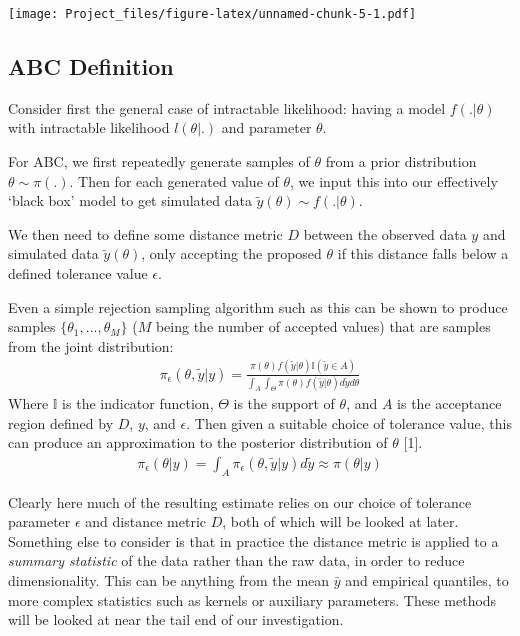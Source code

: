 \documentclass[
]{article}
\begin{document}
\texttt{[image: Project\_files/figure-latex/unnamed-chunk-5-1.pdf]}

\subsection{ABC Definition}\label{abc-definition}

Consider first the general case of intractable likelihood: having a
model \(f(.|\theta)\) with intractable likelihood \(l(\theta|.)\) and
parameter \(\theta\).

For ABC, we first repeatedly generate samples of \(\theta\) from a prior
distribution \(\theta \sim \pi(.)\). Then for each generated value of
\(\theta\), we input this into our effectively `black box' model to get
simulated data \(\tilde{y}(\theta) \sim f(.|\theta)\).

We then need to define some distance metric \(D\) between the observed
data \(y\) and simulated data \(\tilde{y}(\theta)\), only accepting the
proposed \(\theta\) if this distance falls below a defined tolerance
value \(\epsilon\).

Even a simple rejection sampling algorithm such as this can be shown to
produce samples \(\{\theta_1,...,\theta_M\}\) (\(M\) being the number of
accepted values) that are samples from the joint distribution:\[
\begin{align*}
    \pi_{\epsilon}(\theta,\tilde{y}|y) = \frac{\pi(\theta)f(\tilde{y}|\theta)\mathbb{I}(\tilde{y}\in A)}{\int_A\int_\Theta\pi(\theta)f(\tilde{y}|\theta) d \tilde{y} d \theta}
\end{align*}\] Where \(\mathbb{I}\) is the indicator function,
\(\Theta\) is the support of \(\theta\), and \(A\) is the acceptance
region defined by \(D\), \(y\), and \(\epsilon\). Then given a suitable
choice of tolerance value, this can produce an approximation to the
posterior distribution of \(\theta\) {[}1{]}.\[
\begin{align*}
    \pi_{\epsilon}(\theta|y) = \int_A\pi_{\epsilon}(\theta,\tilde{y}|y)d\tilde{y} \approx \pi(\theta|y)
\end{align*}\]

Clearly here much of the resulting estimate relies on our choice of
tolerance parameter \(\epsilon\) and distance metric \(D\), both of
which will be looked at later. Something else to consider is that in
practice the distance metric is applied to a \emph{summary statistic} of
the data rather than the raw data, in order to reduce dimensionality.
This can be anything from the mean \(\bar{y}\) and empirical quantiles,
to more complex statistics such as kernels or auxiliary parameters.
These methods will be looked at near the tail end of our investigation.
\end{document}
